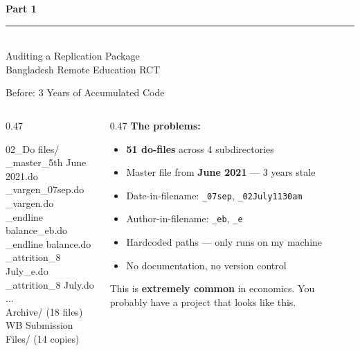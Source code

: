 \documentclass[aspectratio=169, 10pt]{beamer}
\begin{document}
{
\begin{frame}
\centering\vfill
{\fontsize{22}{28}\bfseries\selectfont\color{white} Part 1}\\[6pt]
{\color{UVMGold}\rule{5cm}{0.8pt}}\\[6pt]
{\normalsize\color{UVMGold} Auditing a Replication Package}\\[4pt]
{\small\color{PaleSage} Bangladesh Remote Education RCT}
\vfill
\end{frame}
}

\begin{frame}[fragile]{Before: 3 Years of Accumulated Code}
\vskip-4pt
\begin{columns}[T]
\begin{column}{0.47\textwidth}
\begin{tcolorbox}[colback=DarkSlate, colframe=SoftCoral, boxrule=0.8pt, arc=2pt,
  left=4pt, right=4pt, top=3pt, bottom=3pt]
{\color{CoolGray}\ttfamily\tiny
02\_Do files/\\
\_master\_5th June 2021.do\\
\_vargen\_07sep.do\\
\_vargen.do\\
\_endline balance\_eb.do\\
\_endline balance.do\\
\_attrition\_8 July\_e.do\\
\_attrition\_8 July.do\\
\quad ...\\
\quad Archive/ {\color{CoolGray!50}(18 files)}\\
\quad WB Submission Files/ {\color{CoolGray!50}(14 copies)}
}
\end{tcolorbox}
\end{column}
\begin{column}{0.47\textwidth}
{\small\color{SoftCoral}\textbf{The problems:}}
\vskip3pt
\small
\begin{itemize}\setlength{\itemsep}{2pt}
  \item \textbf{51 do-files} across 4 subdirectories
  \item Master file from \textbf{June 2021} --- 3 years stale
  \item Date-in-filename: \texttt{\_07sep}, \texttt{\_02July1130am}
  \item Author-in-filename: \texttt{\_eb}, \texttt{\_e}
  \item Hardcoded paths --- only runs on my machine
  \item No documentation, no version control
\end{itemize}
\vskip3pt
\begin{tcolorbox}[quotebox, top=2pt, bottom=2pt]
\scriptsize This is \textbf{extremely common} in economics. You probably have a project that looks like this.
\end{tcolorbox}
\end{column}
\end{columns}
\end{frame}
\end{document}
